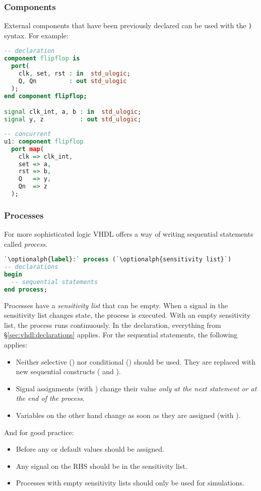 \subsubsection{Components} \label{sec:vhdl:components}
External components that have been previously declared can be used with the
\texttt{)} syntax. For example:
\begin{lstlisting}[language=vhdl]
-- declaration
component flipflop is
  port(
    clk, set, rst : in  std_ulogic;
    Q, Qn         : out std_ulogic 
  );
end component flipflop;

signal clk_int, a, b : in  std_ulogic;
signal y, z          : out std_ulogic;
\end{lstlisting}
\begin{lstlisting}[language=vhdl]
-- concurrent
u1: component flipflop
  port map(
    clk => clk_int,
    set => a,
    rst => b,
    Q   => y,
    Qn  => z
  );

\end{lstlisting}

\subsubsection{Processes}
For more sophisticated logic VHDL offers a way of writing sequential statements
called \emph{process}.
\begin{lstlisting}[language=vhdl]
`\optionalph{label}:` process (`\optionalph{sensitivity list}`)
-- declarations
begin
  -- sequential statements
end process;
\end{lstlisting}
Processes have a \emph{sensitivity list} that can be empty.  When a signal in
the sensitivity list changes state, the process is executed.  With an empty
sensitivity list, the process runs continuously.  In the declaration,
everything from \S\ref{sec:vhdl:declarations} applies. For the sequential
statements, the following applies:
\begin{itemize}
  \item Neither selective () nor conditional () should be used.
    They are replaced with new sequential constructs ( and ).
  \item Signal assignments (with \vhdl{<=}) change their value
    \emph{only at the next}  \emph{statement or at the end of the process}.
  \item Variables on the other hand change as soon as they are assigned (with \vhdl{:=}).
\end{itemize}
And for good practice:
\begin{itemize}
  \item Before any  or  default values should be assigned.
  \item Any signal on the RHS should be in the sensitivity list.
  \item Processes with empty sensitivity lists should only be used for simulations.
\end{itemize}

